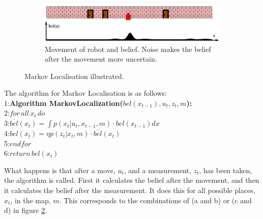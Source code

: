 \begin{figure}[H]
\begin{subfigure}[b]{.8\textwidth}
  \centering
  \includegraphics[width=1\linewidth]{billeder/MarkovLocalisation05.png}
  \caption{Movement of robot and belief. Noise makes the belief after the movement more uncertain.}
  \label{ML_fig1:sub5}
\end{subfigure}

\caption{Markov Localisation illustrated. \citep{thrun2005probabilistic}}
\label{ML_fig1}
\end{figure}

The algorithm for Markov Localisation is as follows:\\
1:\quad \textbf{Algorithm MarkovLocalization(}$bel(x_{t-1}),u_t,z_t,m$\textbf{):}\\
2:\quad \quad $for\,all\,x_t\,do$\\
3:\quad \qquad $\overline{bel}(x_t) = \int p(x_t|u_t,x_{t-1},m)\cdot bel(x_{t-1}) dx$\\
4:\quad \qquad $bel(x_t) = \eta p(z_t|x_t,m)\cdot \overline{bel}(x_t)$\\
5:\quad \quad $endfor$\\
6:\quad \quad $return\,bel(x_t)$

What happens is that after a move, $u_t$, and a measurement, $z_t$, has been taken, the algorithm is called. First it calculates the belief after the movement, and then it calculates the belief after the measurement. It does this for all possible places, $x_t$, in the map, $m$. This corresponds to the combinations of (a and b) or (c and d) in figure \ref{ML_fig1}.